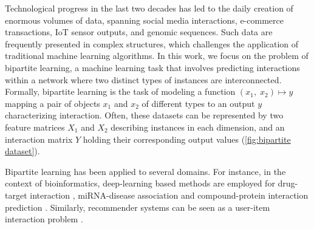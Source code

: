 \documentclass[sn-mathphys-num]{sn-jnl}%
\theoremstyle{thmstyleone}%
\theoremstyle{thmstyletwo}%
\theoremstyle{thmstylethree}%
\begin{document}

Technological progress in the last two decades has led to the daily creation of enormous volumes of data, spanning social media interactions, e-commerce transactions, IoT sensor outputs, and genomic sequences.
Such data are frequently presented in complex structures, which challenges the application of traditional machine learning algorithms.
In this work, we focus on the problem of bipartite learning, a machine learning task that involves predicting interactions within a network where two distinct types of instances are interconnected.
%
Formally, bipartite learning is the task of modeling a function $(x_1,\; x_2) \mapsto y$ mapping a pair of objects $x_1$ and $x_2$ of different types to an output $y$ characterizing interaction. Often, these datasets can be represented by two feature matrices $X_1$ and $X_2$ describing instances in each dimension, and an interaction matrix $Y$ holding their corresponding output values (\autoref{fig:bipartite dataset}).


Bipartite learning has been applied to several domains.
For instance, in the context of bioinformatics, deep-learning based methods are employed for drug-target interaction \cite{huang_moltrans_2020,lin2023comprehensive, bagherian2021machine,liu2024ssldti}, miRNA-disease association \cite{tian2024mgcnss} and compound-protein interaction prediction \cite{tsubaki2019compound}.
Similarly, recommender systems can be seen as a user-item interaction problem \cite{aggarwal2016recommender}.
\end{document}
